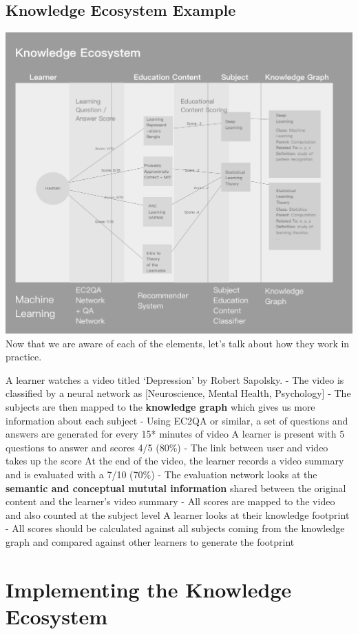 \documentclass[]{book}
\theoremstyle{definition}
\theoremstyle{definition}
\theoremstyle{definition}
\theoremstyle{remark}
\begin{document}
\section{Knowledge Ecosystem
Example}\label{knowledge-ecosystem-example-1}

\includegraphics{img/knowledgeEcosystem.png} Now that we are aware of
each of the elements, let's talk about how they work in practice.

A learner watches a video titled `Depression' by Robert Sapolsky. - The
video is classified by a neural network as {[}Neuroscience, Mental
Health, Psychology{]} - The subjects are then mapped to the
\textbf{knowledge graph} which gives us more information about each
subject - Using EC2QA or similar, a set of questions and answers are
generated for every 15* minutes of video A learner is present with 5
questions to answer and scores 4/5 (80\%) - The link between user and
video takes up the score At the end of the video, the learner records a
video summary and is evaluated with a 7/10 (70\%) - The evaluation
network looks at the \textbf{semantic and conceptual mututal
information} shared between the original content and the learner's video
summary - All scores are mapped to the video and also counted at the
subject level A learner looks at their knowledge footprint - All scores
should be calculated against all subjects coming from the knowledge
graph and compared against other learners to generate the footprint

\chapter{Implementing the Knowledge
Ecosystem}\label{implementing-the-knowledge-ecosystem}
\end{document}
